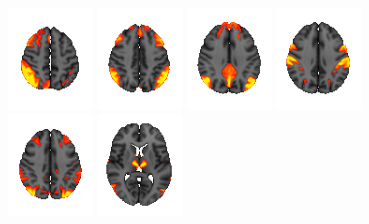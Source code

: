 \documentclass[11pt]{article}
\begin{document}
\begin{figure}[H]
    \centering
    \includegraphics[width=0.2\textwidth]{../Analysis/MIR/groupICA/groupICA_3T_HCP1200_MSMAll_d25.ica/0004.png}
    \includegraphics[width=0.2\textwidth]{../Analysis/MIR/groupICA/groupICA_3T_HCP1200_MSMAll_d25.ica/0005.png}
    \includegraphics[width=0.2\textwidth]{../Analysis/MIR/groupICA/groupICA_3T_HCP1200_MSMAll_d25.ica/0001.png}
    \includegraphics[width=0.2\textwidth]{../Analysis/MIR/groupICA/groupICA_3T_HCP1200_MSMAll_d25.ica/0009.png} \\
    \includegraphics[width=0.2\textwidth]{../Analysis/MIR/groupICA/groupICA_3T_HCP1200_MSMAll_d25.ica/0007.png}
    \includegraphics[width=0.2\textwidth]{../Analysis/MIR/groupICA/groupICA_3T_HCP1200_MSMAll_d25.ica/0024.png}

\end{figure}
\end{document}
